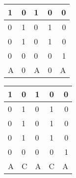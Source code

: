 \begin{multicols}{2}

	\begin{tabular}{ l |l l c r }
	  
	  1 & 0 & 1 & 0 & 0 \\
	  \hline
	  0 & 1 & 0 & 1 & 0 \\
	  0 & 1 & 0 & 1 & 0 \\
	  0 & 0 & 0 & 0 & 1 \\
	  \hline	
	  A & 0 & A & 0 & A \\
	
	\end{tabular}
\columnbreak{|}
	\begin{tabular}{ l |l l c r }
	  
	  1 & 0 & 1 & 0 & 0 \\
	  \hline
	  0 & 1 & 0 & 1 & 0 \\
	  0 & 1 & 0 & 1 & 0 \\
	  0 & 1 & 0 & 1 & 0 \\
	  0 & 0 & 0 & 0 & 1 \\
	  \hline	
	  A & C & A & C & A \\
	
	\end{tabular}

\end{multicols}